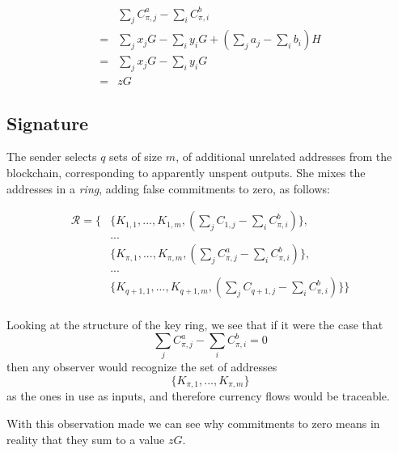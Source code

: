 \begin{align*}
& \sum\limits_j C^a_{\pi, j} - \sum\limits_i C^b_{\pi, i} \\
= & \sum\limits_j x_j G - \sum\limits_i y_i G + (\sum\limits_j  a_j - \sum\limits_i  b_i) H\\
= & \sum\limits_j x_j G - \sum\limits_i y_i G \\
= & z G
\end{align*}






\subsection{Signature}
\label{full-signature}



The sender selects \(q\) sets of size \(m\), of additional unrelated addresses from the blockchain, corresponding to apparently unspent outputs. 
She mixes the addresses in a {\em ring}, adding false commitments to zero, as follows:

\begin{align*}
  \mathcal{R} = \{ &\{K_{1, 1}, ..., K_{1, m}, (\sum\limits_j C_{1, j} - \sum\limits_i C^b_{\pi,i})\}, \\
  &... \\
  &\{K_{\pi, 1}, ..., K_{\pi, m}, (\sum\limits_j C^a_{\pi, j} - \sum\limits_i C^b_{\pi,i})\}, \\
  &... \\
  &\{K_{q+1, 1}, ..., K_{q+1, m}, (\sum\limits_j C_{q+1, j} - \sum\limits_i C^b_{\pi,i})\}\}
\end{align*}
\\

Looking at the structure of the key ring, we see that if it were the case that \[\sum\limits_j C^a_{\pi, j} -\sum\limits_i C^b_{\pi, i} = 0\] then any observer would recognize the set of addresses
\[\{K_{\pi, 1}, ..., K_{\pi, m}\} \]
as the ones in use as inputs, and therefore currency flows would be traceable.

With this observation made we can see why commitments to zero means in reality that they sum to a value \(z G\).



